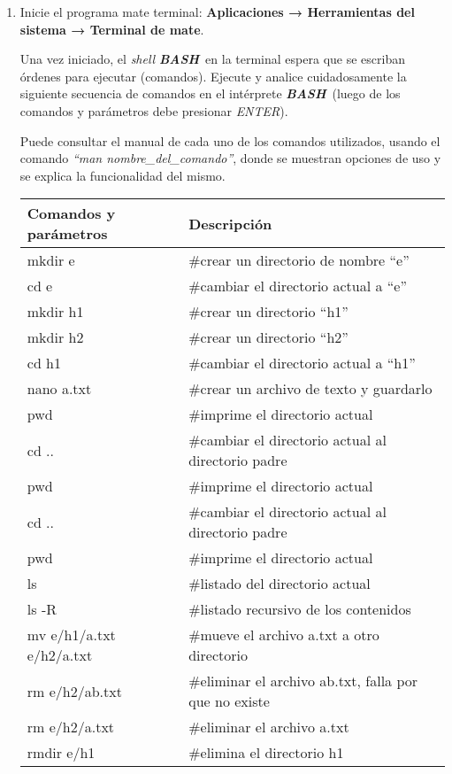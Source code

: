 \documentclass[12pt]{article}
\newcommand{\bash}{\textbf{\emph{BASH}}\ }
\begin{document}
\begin{enumerate}

    \item Inicie el programa mate terminal: \textbf{Aplicaciones →
        Herramientas del sistema → Terminal de mate}.

        Una vez iniciado, el \emph{shell} \bash en la terminal espera que se
        escriban órdenes para ejecutar (comandos). Ejecute y analice
        cuidadosamente la siguiente secuencia de comandos en el intérprete
        \bash (luego de los comandos y parámetros debe presionar
        \emph{ENTER}).

        Puede consultar el manual de cada uno de los comandos utilizados,
        usando el comando \emph{``man nombre\_del\_comando''}, donde se
        muestran opciones de uso y se explica la funcionalidad del mismo.

\begin{center}

    \begin{tabular}[t]{l l }
    \hline
        \textbf{Comandos y parámetros} & \textbf{Descripción} \\
    \hline
    \hline
        mkdir e &  \#crear un directorio de nombre ``e'' \\
        cd e &  \#cambiar el directorio actual a ``e'' \\
        mkdir h1 &  \#crear un directorio ``h1'' \\
        mkdir h2 &  \#crear un directorio ``h2'' \\
        cd h1 &  \#cambiar el directorio actual a ``h1'' \\
        nano a.txt &  \#crear un archivo de texto y guardarlo \\
        pwd &  \#imprime el directorio actual \\
        cd .. &  \#cambiar el directorio actual al directorio padre \\
        pwd &  \#imprime el directorio actual \\
        cd .. &  \#cambiar el directorio actual al directorio padre \\
        pwd &  \#imprime el directorio actual \\
        ls &  \#listado del directorio actual \\
        ls -R &  \#listado recursivo de los contenidos \\
        mv e/h1/a.txt e/h2/a.txt &  \#mueve el archivo a.txt a otro directorio \\
        rm e/h2/ab.txt &  \#eliminar el archivo ab.txt, falla por que no
        existe\\
        rm e/h2/a.txt &  \#eliminar el archivo a.txt \\
        rmdir e/h1 &  \#elimina el directorio h1 \\
    \hline
    \end{tabular}


\end{center}
\end{enumerate}
\end{document}
